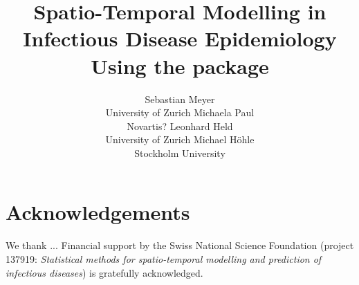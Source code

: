 \documentclass[article]{jss}
\author{Sebastian Meyer\\University of Zurich \And
        Michaela Paul\\Novartis? \And
        Leonhard Held\\University of Zurich \And
        Michael Höhle\\Stockholm University}
\title{Spatio-Temporal Modelling in Infectious Disease Epidemiology Using the
\proglang{R} package \pkg{surveillance}}
\begin{document}









\section*{Acknowledgements}

We thank ...
Financial support by the Swiss National Science Foundation
(project 137919: \emph{Statistical methods for spatio-temporal modelling and
  prediction of infectious diseases}) is gratefully acknowledged.



\nocite{R:2.15.3}
\iffalse
\fi
\end{document}
